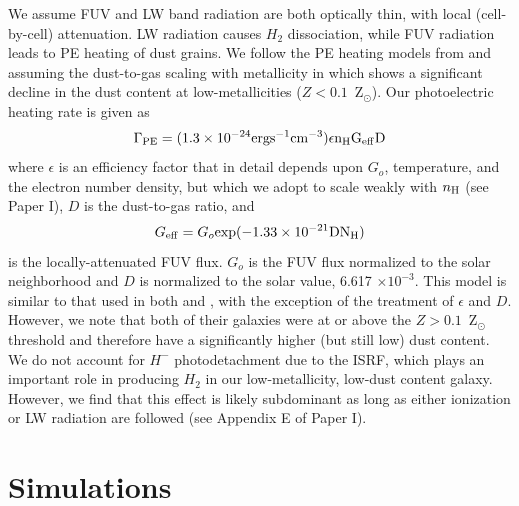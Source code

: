 \documentclass[twocolumn]{aastex62}
\begin{document}
We assume FUV and LW band radiation are both optically thin, with local (cell-by-cell) attenuation. LW radiation causes $H_2$ dissociation, while FUV radiation leads to PE heating of dust grains. We follow the PE heating models from \cite{Wolfire2003} and assuming the dust-to-gas scaling with metallicity in \cite{Remy-Ruyer2014} which shows a significant decline in the dust content at low-metallicities ($Z < 0.1$~Z$_{\odot}$). Our photoelectric heating rate is given as
\begin{equation}
    \Gamma_{\rm PE} = (1.3 \times 10^{-24} \rm{erg s^{-1} cm^{-3}}) \epsilon n_{\rm H} G_{\rm eff} D
\end{equation}
where $\epsilon$ is an efficiency factor that in detail depends upon $G_o$, temperature, and the electron number density, but which we adopt to scale weakly with $n_{\rm H}$ (see Paper I), $D$ is the dust-to-gas ratio, and
\begin{equation}
    G_{\rm eff} = G_o \rm{exp}(-1.33\times 10^{-21} D N_{\rm H})
\end{equation}
is the locally-attenuated FUV flux. $G_o$ is the FUV flux normalized to the solar neighborhood \citep{Habing1968} and $D$ is normalized to the solar value, 6.617 $\times 10^{-3}$. This model is similar to that used in both \cite{Forbes2016} and \cite{Hu2017}, with the exception of the treatment of $\epsilon$ and $D$. However, we note that both of their galaxies were at or above the $Z > 0.1$~Z$_{\odot}$ threshold and therefore have a significantly higher (but still low) dust content. We do not account for $H^-$ photodetachment due to the ISRF, which plays an important role in producing $H_2$ in our low-metallicity, low-dust content galaxy. However, we find that this effect is likely subdominant as long as either ionization or LW radiation are followed (see Appendix E of Paper I).

\section{Simulations}
\label{sec:runs}
\end{document}
